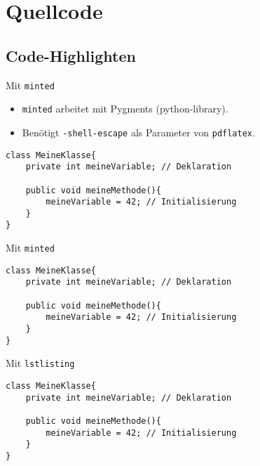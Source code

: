 \documentclass{beamer}
\begin{document}
		\section{Quellcode}
		\subsection{Code-Highlighten}


		\begin{frame}[containsverbatim]{Mit \texttt{minted}}
			\begin{itemize}
				\item \texttt{minted} arbeitet mit Pygments (python-library).
				\item Benötigt \texttt{-shell-escape} als Parameter von \texttt{pdflatex}.
			\end{itemize}

			\begin{smalllatexcode}
\usepackage{minted}
\begin{verbatim}
class MeineKlasse{
	private int meineVariable; // Deklaration

	public void meineMethode(){
		meineVariable = 42; // Initialisierung
	}
}
\end{verbatim}
			\end{smalllatexcode}
		\end{frame}


		\begin{frame}[containsverbatim]{Mit \texttt{minted}}
			\begin{verbatim}
class MeineKlasse{
	private int meineVariable; // Deklaration

	public void meineMethode(){
		meineVariable = 42; // Initialisierung
	}
}
			\end{verbatim}
		\end{frame}


		\begin{frame}[containsverbatim]{Mit \texttt{lstlisting}}
			\begin{smallerlatexcode}
\usepackage{listings}
\lstset{...} %
\begin{lstlisting}[caption=Variablen]
class MeineKlasse{
	private int meineVariable; // Deklaration

	public void meineMethode(){
		meineVariable = 42; // Initialisierung
	}
}
\end{lstlisting}
			\end{smallerlatexcode}
		\end{frame}
\end{document}

